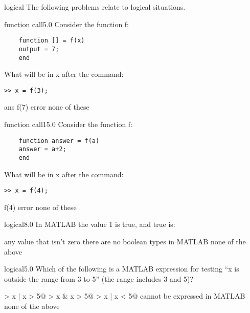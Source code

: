 \documentclass{exam}
\begin{document}


\begin{block}{logical}
The following problems relate to logical situations.
\end{block}
\begin{problem}{function call}{5.0}
Consider the function f:
  \begin{verbatim}
    function [] = f(x)
    output = 7;
    end
  \end{verbatim}
  What will be in x after the command:
  \begin{verbatim}>> x = f(3);\end{verbatim}
\begin{answers}
\answer ans
\answer f(7)
 error %
\answer[fixed] none of these %
\end{answers}
\end{problem}
\begin{problem}{function call}{15.0}
Consider the function f:
  \begin{verbatim}
    function answer = f(a)
    answer = a+2;
    end
  \end{verbatim}
  What will be in x after the command:
  \begin{verbatim}>> x = f(4);
  \end{verbatim}
\begin{answers}
\answer f(4)
\answer[fixed] error %
\answer[fixed] none of these %
\end{answers}
\end{problem}
\begin{problem}{logical}{8.0}
In MATLAB the value 1 is true, and true is:
\begin{answers}
\answer[correct] any value that isn't zero %
\answer there are no boolean types in MATLAB
\answer[fixed] none of the above %
\end{answers}
\end{problem}
\begin{problem}{logical}{5.0}
Which of the following is a MATLAB expression for testing ``x is
  outside the range from 3 to 5'' (the range includes 3 and 5)? 
\begin{answers}
\answer[correct]  > x | x > 5@ %
\answer {} > x & x > 5@
\answer {} > x | x < 5@
\answer[fixed] cannot be expressed in MATLAB %
\answer[fixed] none of the above %
\end{answers}
\end{problem}
\end{document}
